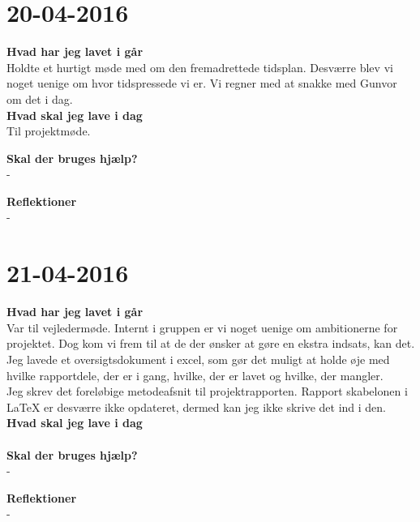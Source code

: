 \documentclass{article}
\begin{document}
	
	
	\section{20-04-2016}
	
	\textbf{Hvad har jeg lavet i går}\\
	Holdte et hurtigt møde med om den fremadrettede tidsplan. Desværre blev vi noget uenige om hvor tidspressede vi er. Vi regner med at snakke med Gunvor om det i dag.\\
	
	\textbf{Hvad skal jeg lave i dag}\\
	Til projektmøde.
	
	\textbf{Skal der bruges hjælp?}\\
	-
	
	\textbf{Reflektioner}\\
	-
	
	
	
	\section{21-04-2016}
	
	\textbf{Hvad har jeg lavet i går}\\
	Var til vejledermøde. Internt i gruppen er vi noget uenige om ambitionerne for projektet. Dog kom vi frem til at de der ønsker at gøre en ekstra indsats, kan det.\\
	Jeg lavede et oversigtsdokument i excel, som gør det muligt at holde øje med hvilke rapportdele, der er i gang, hvilke, der er lavet og hvilke, der mangler.\\
	Jeg skrev det foreløbige metodeafsnit til projektrapporten. Rapport skabelonen i LaTeX er desværre ikke opdateret, dermed kan jeg ikke skrive det ind i den.\\ 
	
	\textbf{Hvad skal jeg lave i dag}\\
	\\
	
	\textbf{Skal der bruges hjælp?}\\
	-
	
	\textbf{Reflektioner}\\
	-
\end{document}
